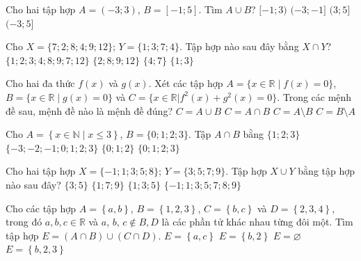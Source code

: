 \begin{ex}%
	Cho hai tập  hợp $A=(-3;3)$, $B=[-1;5]$. Tìm $A \cup B$?
	\choice 
		 {$[-1;3)$}
		{$(-3;-1]$} 
		 {$(3;5]$}
		{\True $(-3;5]$} 
	\loigiai{ 
	Ta có $A  \cup B=(-3;5]$.}
\end{ex}

\begin{ex}%
	 Cho $X=\{7;2;8;4;9;12\}$; $Y=\{ 1;3;7;4\}$. Tập hợp nào sau đây bằng $X\cap Y$?
	\choice 
		{  $\{1;2;3;4;8;9;7;12\}$}
		 {$\{2;8;9;12\}$}
		{\True  $\{4;7\}$}
		 {$\{1;3\}$}
\end{ex}

\begin{ex}%
	Cho hai đa thức $f(x)$ và $g(x)$. Xét các tập hợp $A=\{x\in\mathbb{R}\;\big|\;f(x)=0\}$, $B=\{x\in\mathbb{R}\;\big|\;g(x)=0\}$ và $C=\{x\in\mathbb{R}|f^2(x)+g^2(x)=0\}$. Trong các mệnh đề sau, mệnh đề nào là mệnh  đề đúng?
	\choice 
		{$C=A\cup B$} 
		{\True $C=A\cap  B$}
		{$C=A\setminus  B$}
		{$C=B\setminus  A$}
\end{ex}

\begin{ex}%
	Cho $A=\left\{x\in \mathbb{N}\;|\;x\leqslant 3\right\}$, $B=\{0;1;2;3\}$. Tập $A\cap B$  bằng
	 \choice
		{$\{1;2;3\}$} 
		{$\{-3;-2;-1;0;1;2;3\}$} 
		{$\{0;1;2\}$} 
		{\True $\{0;1;2;3\}$} 
\end{ex}

\begin{ex}%
	Cho hai tập hợp $X=\{-1;1;3;5;8\}$; $Y=\{3;5;7;9\}$. Tập hợp $X\cup Y$ bằng tập  hợp nào sau đây?
	 \choice
		{$\{3;5\}$} 
		{$\{1;7;9\}$} 
		{$\{1;3;5\}$} 
		 {\True $\{-1;1;3;5;7;8;9\}$}
\end{ex}

\begin{ex}%
	Cho các tập hợp $A=\left\{a,b\right\}$, $B=\left\{1,2,3\right\}$, $C=\left\{b,c\right\}$ và $D=\left\{2,3,4\right\}$, trong đó $a, b, c\in\mathbb{R}$ và $a$, $b$, $c\notin B,D$ là các phần tử khác nhau từng đôi một. Tìm tập hợp  $E=\left(A\cap B\right)\cup\left(C\cap D\right)$.
	\choice 
		 {$E=\left\{a,c\right\}$}
		 {$E=\left\{b,2\right\}$}
		 {\True $E=\varnothing$}
		{$E=\left\{b,2,3\right\}$} 
\end{ex}

